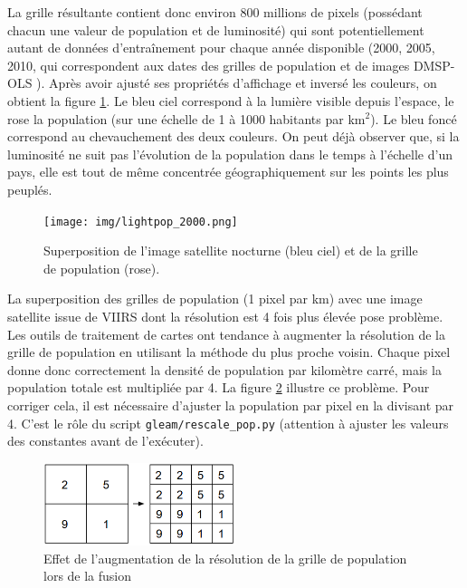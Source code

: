 \documentclass[a4paper, 11pt]{report}
\begin{document}
La grille résultante contient donc environ 800 millions de pixels (possédant chacun une valeur de population et de luminosité) qui sont potentiellement autant de données d'entraînement pour chaque année disponible (2000, 2005, 2010, qui correspondent aux dates des grilles de population et de images DMSP-OLS \cite{noaa}). Après avoir ajusté ses propriétés d'affichage et inversé les couleurs, on obtient la figure \ref{lightpop_2000}. Le bleu ciel correspond à la lumière visible depuis l'espace, le rose la population (sur une échelle de 1 à 1000 habitants par km$^2$). Le bleu foncé correspond au chevauchement des deux couleurs. On peut déjà observer que, si la luminosité ne suit pas l'évolution de la population dans le temps à l'échelle d'un pays, elle est tout de même concentrée géographiquement sur les points les plus peuplés.


\begin{figure}
	\centering
	\texttt{[image: img/lightpop\_2000.png]}
	\caption{Superposition de l'image satellite nocturne (bleu ciel) et de la grille de population (rose).}
	\label{lightpop_2000}
\end{figure}

La superposition des grilles de population (1 pixel par km) avec une image satellite issue de VIIRS \cite{noaa-viirs} dont la résolution est 4 fois plus élevée pose problème. Les outils de traitement de cartes ont tendance à augmenter la résolution de la grille de population en utilisant la méthode du plus proche voisin. Chaque pixel donne donc correctement la densité de population par kilomètre carré, mais la population totale est multipliée par 4. La figure \ref{upsampling} illustre ce problème. Pour corriger cela, il est nécessaire d'ajuster la population par pixel en la divisant par 4. C'est le rôle du script \texttt{gleam/rescale\_pop.py} (attention à ajuster les valeurs des constantes avant de l'exécuter).

\begin{figure}
	\centering
	\includegraphics[width=0.5\textwidth]{img/upsampling.png}
	\caption{Effet de l'augmentation de la résolution de la grille de population lors de la fusion}
	\label{upsampling}
\end{figure}
\end{document}
